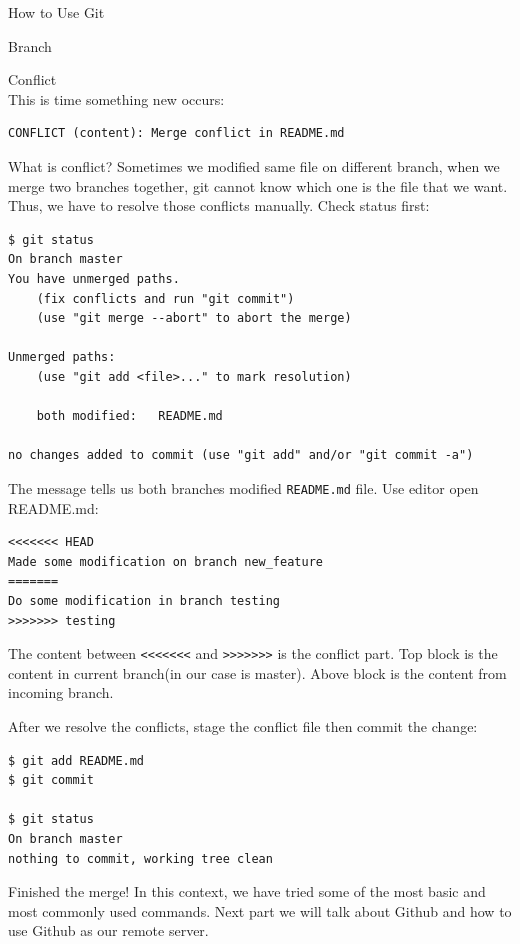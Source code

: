 \documentclass[10pt, a4papaer]{article}
\begin{document}
\begin{section}{How to Use Git}
\begin{subsection}{Branch}
\begin{paragraph}{Conflict\\}
This is time something new occurs:
\begin{lstlisting}
CONFLICT (content): Merge conflict in README.md
\end{lstlisting}

What is conflict? Sometimes we modified same file on different branch, when we
merge two branches together, git cannot know which one is the file that we want.
Thus, we have to resolve those conflicts manually. Check status first:

\begin{lstlisting}
$ git status
On branch master
You have unmerged paths.
    (fix conflicts and run "git commit")
    (use "git merge --abort" to abort the merge)

Unmerged paths:
    (use "git add <file>..." to mark resolution)

    both modified:   README.md

no changes added to commit (use "git add" and/or "git commit -a")
\end{lstlisting}

The message tells us both branches modified \verb|README.md| file.
Use editor open README.md:

\begin{lstlisting}
<<<<<<< HEAD
Made some modification on branch new_feature
=======
Do some modification in branch testing
>>>>>>> testing
\end{lstlisting}

The content between \verb|<<<<<<<| and \verb|>>>>>>>| is the conflict part.
Top block is the content in current branch(in our case is master). Above block
is the content from incoming branch.

After we resolve the conflicts, stage the conflict file then commit the change:

\begin{lstlisting}
$ git add README.md
$ git commit

$ git status
On branch master
nothing to commit, working tree clean
\end{lstlisting}

Finished the merge! In this context, we have tried some of the most basic and
most commonly used commands. Next part we will talk about Github and how to use
Github as our remote server.
\end{paragraph}

\end{subsection}
\end{section}
\newpage
\end{document}
